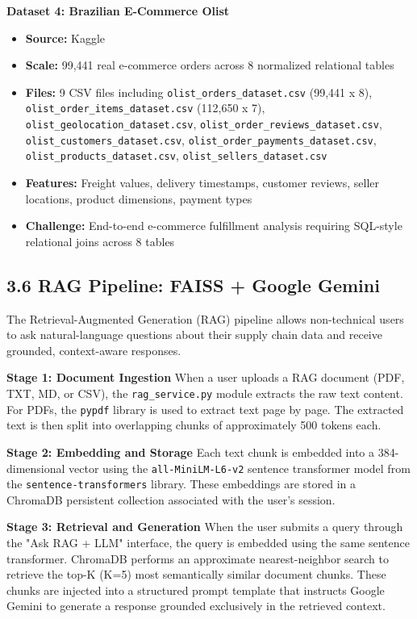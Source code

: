 \documentclass[12pt, a4paper]{report}
\begin{document}
\textbf{Dataset 4: Brazilian E-Commerce Olist}
\begin{itemize}
\item \textbf{Source:} Kaggle
\item \textbf{Scale:} 99,441 real e-commerce orders across 8 normalized relational tables
\item \textbf{Files:} 9 CSV files including \texttt{olist\_orders\_dataset.csv} (99,441 x 8), \texttt{olist\_order\_items\_dataset.csv} (112,650 x 7), \texttt{olist\_geolocation\_dataset.csv}, \texttt{olist\_order\_reviews\_dataset.csv}, \texttt{olist\_customers\_dataset.csv}, \texttt{olist\_order\_payments\_dataset.csv}, \texttt{olist\_products\_dataset.csv}, \texttt{olist\_sellers\_dataset.csv}
\item \textbf{Features:} Freight values, delivery timestamps, customer reviews, seller locations, product dimensions, payment types
\item \textbf{Challenge:} End-to-end e-commerce fulfillment analysis requiring SQL-style relational joins across 8 tables
\end{itemize}

\subsection{3.6 RAG Pipeline: FAISS + Google Gemini}

The Retrieval-Augmented Generation (RAG) pipeline allows non-technical users to ask natural-language questions about their supply chain data and receive grounded, context-aware responses.


\textbf{Stage 1: Document Ingestion}
When a user uploads a RAG document (PDF, TXT, MD, or CSV), the \texttt{rag\_service.py} module extracts the raw text content. For PDFs, the \texttt{pypdf} library is used to extract text page by page. The extracted text is then split into overlapping chunks of approximately 500 tokens each.

\textbf{Stage 2: Embedding and Storage}
Each text chunk is embedded into a 384-dimensional vector using the \texttt{all-MiniLM-L6-v2} sentence transformer model from the \texttt{sentence-transformers} library. These embeddings are stored in a ChromaDB persistent collection associated with the user's session.

\textbf{Stage 3: Retrieval and Generation}
When the user submits a query through the "Ask RAG + LLM" interface, the query is embedded using the same sentence transformer. ChromaDB performs an approximate nearest-neighbor search to retrieve the top-K (K=5) most semantically similar document chunks. These chunks are injected into a structured prompt template that instructs Google Gemini to generate a response grounded exclusively in the retrieved context.
\end{document}
